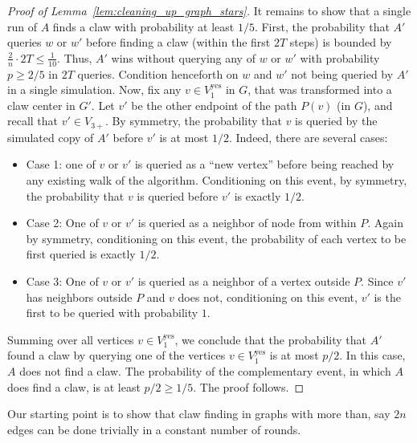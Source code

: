 \documentclass[11pt]{article}
\numberwithin{equation}{section}
\newcommand{\1}{\mathbf{1}}
\begin{document}
\begin{proof}[Proof of Lemma~\ref{lem:cleaning_up_graph_stars}]
It remains to show that a single run of $A$ finds a claw with probability at least $1/5$. First, the probability that $A'$ queries $w$ or $w'$ before finding a claw (within the first $2T$ steps) is bounded by $\frac{2}{n} \cdot 2T \leq \frac{1}{10}$. Thus, $A'$ wins without querying any of $w$ or $w'$ with probability $p \geq 2/5$ in $2T$ queries. Condition henceforth on $w$ and $w'$ not being queried by $A'$ in a single simulation. Now, fix any $v \in V_1^{\text{yes}}$ in $G$, that was transformed into a claw center in $G'$. Let $v'$ be the other endpoint of the path $P(v)$ (in $G$), and recall that $v' \in V_{3+}$. By symmetry, the probability that $v$ is queried by the simulated copy of $A'$ before $v'$ is at most $1/2$. Indeed, there are several cases:
\begin{itemize}
\item Case 1: one of $v$ or $v'$ is queried as a ``new vertex'' before being reached by any existing walk of the algorithm. Conditioning on this event, by symmetry, the probability that $v$ is queried before $v'$ is exactly $1/2$.
\item Case 2: One of $v$ or $v'$ is queried as a neighbor of node from within $P$. Again by symmetry, conditioning on this event, the probability of each vertex to be first queried is exactly $1/2$.
\item Case 3: One of $v$ or $v'$ is queried as a neighbor of a vertex outside $P$. Since $v'$ has neighbors outside $P$ and $v$ does not, conditioning on this event, $v'$ is the first to be queried with probability $1$.
\end{itemize}






Summing over all vertices $v \in V_1^{\text{yes}}$, we conclude that the probability that $A'$ found a claw by querying one of the vertices $v \in V_1^{\text{yes}}$ is at most $p/2$. In this case, $A$ does not find a claw. The probability of the complementary event, in which $A$ does find a claw, is at least $p/2 \geq 1/5$. The proof follows.
\end{proof}

\iffalse
Our starting point is to show that claw finding in graphs with more than, say $2n$ edges can be done trivially in a constant number of rounds.
\end{document}

